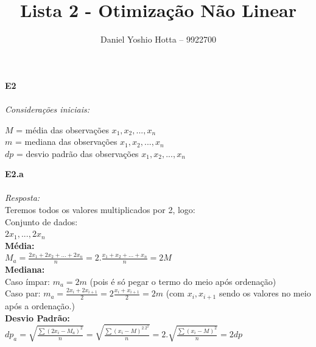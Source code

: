 \documentclass{article}
\begin{document}
	
	\title{Lista 2 - Otimização Não Linear}
	\author{Daniel Yoshio Hotta – 9922700}
	
	\maketitle	
	
	\textbf {E2} 
	\\ \\
	\textit {Considerações iniciais:} \\
	
	\begin{center}
		$M$ = média das observações ${x_1, x_2, ..., x_n}$\\
		$m$ = mediana das observações ${x_1, x_2, ..., x_n}$\\
		$dp$ = desvio padrão das observações ${x_1, x_2, ..., x_n}$\\
	\end{center}
	
	\textbf {E2.a} 
	\\ \\
	\textit {Resposta:} \\
	
	Teremos todos os valores multiplicados por 2, logo:\\
	
	Conjunto de dados:\\
	
	${2x_1, ..., 2x_n}$\\
	
	\textbf {Média:}\\
	
	$M_a = \frac{2x_1 + 2x_2 + ... + 2x_n}{n} = 2 . \frac{x_1 + x_2 + ... + x_n}{n} = 2M$\\
	
	\textbf {Mediana:}\\
	
	Caso ímpar: $m_a = 2m$ (pois é só pegar o termo do meio após ordenação)\\
	
	Caso par: $m_a = \frac{2x_i + 2x_{i+1}}{2} = 2 \frac{x_i + x_{i+1}}{2} = 2m$ (com $x_i, x_{i+1}$ sendo os valores no meio após a ordenação.)\\
	
	\textbf {Desvio Padrão:}\\
	
	$dp_a = \sqrt{\frac {\sum (2x_i - M_a)^2}{n}} = \sqrt{\frac {\sum (x_i - M)^2.2^2}{n}} = 2. \sqrt{\frac {\sum (x_i - M)^2}{n}} = 2dp$\\
	
\end{document}
